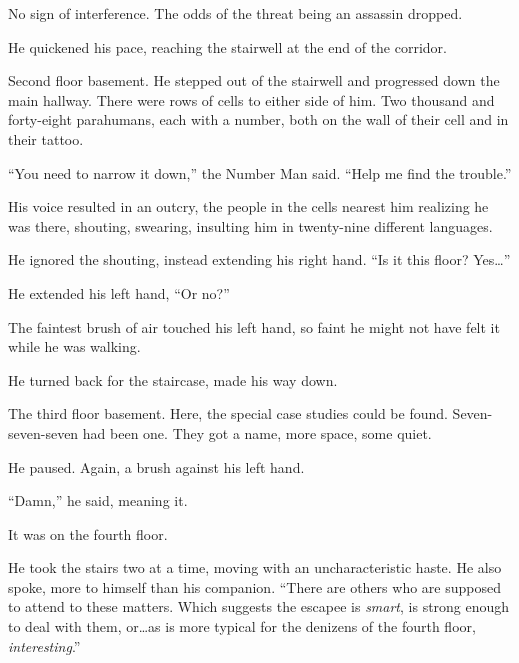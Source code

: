 No sign of interference.  The odds of the threat being an assassin dropped.



He quickened his pace, reaching the stairwell at the end of the corridor.



Second floor basement.  He stepped out of the stairwell and progressed down the main hallway.  There were rows of cells to either side of him.  Two thousand and forty-eight parahumans, each with a number, both on the wall of their cell and in their tattoo.



``You need to narrow it down,'' the Number Man said.  ``Help me find the trouble.''



His voice resulted in an outcry, the people in the cells nearest him realizing he was there, shouting, swearing, insulting him in twenty-nine different languages.



He ignored the shouting, instead extending his right hand.  ``Is it this floor?  Yes\ldots''



He extended his left hand, ``Or no?''



The faintest brush of air touched his left hand, so faint he might not have felt it while he was walking.



He turned back for the staircase, made his way down.



The third floor basement.  Here, the special case studies could be found.  Seven-seven-seven had been one.  They got a name, more space, some quiet.



He paused.  Again, a brush against his left hand.



``Damn,'' he said, meaning it.



It was on the fourth floor.



He took the stairs two at a time, moving with an uncharacteristic haste.  He also spoke, more to himself than his companion.  ``There are others who are supposed to attend to these matters.  Which suggests the escapee is \emph{smart}, is strong enough to deal with them, or\ldots as is more typical for the denizens of the fourth floor, \emph{interesting}.''



